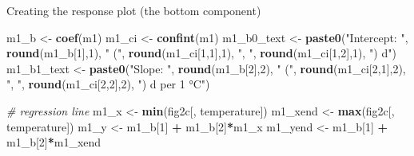 \documentclass[]{book}
\newenvironment{Shaded}{\begin{snugshade}}{\end{snugshade}}
\newcommand{\CommentTok}[1]{\textcolor[rgb]{0.56,0.35,0.01}{\textit{#1}}}
\newcommand{\DecValTok}[1]{\textcolor[rgb]{0.00,0.00,0.81}{#1}}
\newcommand{\KeywordTok}[1]{\textcolor[rgb]{0.13,0.29,0.53}{\textbf{#1}}}
\newcommand{\NormalTok}[1]{#1}
\newcommand{\OperatorTok}[1]{\textcolor[rgb]{0.81,0.36,0.00}{\textbf{#1}}}
\newcommand{\StringTok}[1]{\textcolor[rgb]{0.31,0.60,0.02}{#1}}
\begin{document}
Creating the response plot (the bottom component)

\begin{Shaded}
\begin{Highlighting}[]
\NormalTok{m1_b <-}\StringTok{ }\KeywordTok{coef}\NormalTok{(m1)}
\NormalTok{m1_ci <-}\StringTok{ }\KeywordTok{confint}\NormalTok{(m1)}
\NormalTok{m1_b0_text <-}\StringTok{ }\KeywordTok{paste0}\NormalTok{(}\StringTok{"Intercept: "}\NormalTok{,}
                  \KeywordTok{round}\NormalTok{(m1_b[}\DecValTok{1}\NormalTok{],}\DecValTok{1}\NormalTok{),}
                  \StringTok{" ("}\NormalTok{,}
                  \KeywordTok{round}\NormalTok{(m1_ci[}\DecValTok{1}\NormalTok{,}\DecValTok{1}\NormalTok{],}\DecValTok{1}\NormalTok{),}
                  \StringTok{", "}\NormalTok{,}
                  \KeywordTok{round}\NormalTok{(m1_ci[}\DecValTok{1}\NormalTok{,}\DecValTok{2}\NormalTok{],}\DecValTok{1}\NormalTok{),}
                  \StringTok{") d"}\NormalTok{)}
\NormalTok{m1_b1_text <-}\StringTok{ }\KeywordTok{paste0}\NormalTok{(}\StringTok{"Slope: "}\NormalTok{,}
                  \KeywordTok{round}\NormalTok{(m1_b[}\DecValTok{2}\NormalTok{],}\DecValTok{2}\NormalTok{),}
                  \StringTok{" ("}\NormalTok{,}
                  \KeywordTok{round}\NormalTok{(m1_ci[}\DecValTok{2}\NormalTok{,}\DecValTok{1}\NormalTok{],}\DecValTok{2}\NormalTok{),}
                  \StringTok{", "}\NormalTok{,}
                  \KeywordTok{round}\NormalTok{(m1_ci[}\DecValTok{2}\NormalTok{,}\DecValTok{2}\NormalTok{],}\DecValTok{2}\NormalTok{),}
                  \StringTok{") d per 1 °C"}\NormalTok{)}

\CommentTok{# regression line}
\NormalTok{m1_x <-}\StringTok{ }\KeywordTok{min}\NormalTok{(fig2c[, temperature])}
\NormalTok{m1_xend <-}\StringTok{ }\KeywordTok{max}\NormalTok{(fig2c[, temperature])}
\NormalTok{m1_y <-}\StringTok{ }\NormalTok{m1_b[}\DecValTok{1}\NormalTok{] }\OperatorTok{+}\StringTok{ }\NormalTok{m1_b[}\DecValTok{2}\NormalTok{]}\OperatorTok{*}\NormalTok{m1_x}
\NormalTok{m1_yend <-}\StringTok{ }\NormalTok{m1_b[}\DecValTok{1}\NormalTok{] }\OperatorTok{+}\StringTok{ }\NormalTok{m1_b[}\DecValTok{2}\NormalTok{]}\OperatorTok{*}\NormalTok{m1_xend}


\end{Highlighting}
\end{Shaded}
\end{document}

